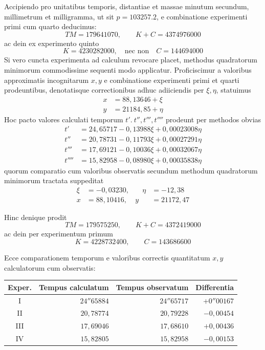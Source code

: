 Accipiendo pro unitatibus temporis, distantiae et massae minutum secundum, millimetrum et milligramma, ut sit $p=103257.2$, e combinatione experimenti primi cum quarto deducimus:
\[
TM=179641070,\qquad K+C=4374976000
\]
ac dein ex experimento quinto
\[
K=4230282000,\quad \text{nec non}\quad C=144694000
\]
Si vero cuncta experimenta ad calculum revocare placet, methodus quadratorum minimorum commodissime sequenti modo applicatur. Proficiscimur a valoribus approximatis incognitarum $x,y$ e combinatione experimenti primi et quarti prodeuntibus, denotatisque correctionibus adhuc adiiciendis per $\xi,\eta$, statuimus
\[
\begin{aligned}
x&=88{,}13646+\xi\\
y&=21184{,}85+\eta
\end{aligned}
\]
Hoc pacto valores calculati temporum $t'.\ t'',t''',t''''$ prodeunt per methodos obvias
\[
\begin{aligned}
t'&=24{,}65717-0{,}13988\xi+0{,}00023008\eta\\
t''&=20{,}78731-0{,}11793\xi+0{,}00027291\eta\\
t'''&=17{,}69121-0{,}10036\xi+0{,}00032067\eta\\
t''''&=15{,}82958-0{,}08980\xi+0{,}00035838\eta
\end{aligned}
\]
quorum comparatio cum valoribus observatis secundum methodum quadratorum minimorum tractata suppeditat
\[
\begin{aligned}
\xi&=-0{,}03230,&\quad\eta&=-12{,}38\\
x&=88{,}10416,&y&=21172{,}47
\end{aligned}
\]

Hinc denique prodit
\[
TM=179575250,\qquad K+C=4372419000
\]
ac dein per experimentum primum
\[
K=4228732400,\qquad C=143686600
\]

Ecce comparationem temporum e valoribus correctis quantitatum $x,y$ calculatorum cum observatis:
\begin{center}
\begin{tabular}{c|r|r|r}
Exper.&Tempus calculatum&Tempus observatum&Differentia\\\hline
I&$24''65884$&$24''65717$&$+0''00167$\\
II&$20{,}78774$&$20{,}79228$&$-0{,}00454$\\
III&$17{,}69046$&$17{,}68610$&$+0{,}00436$\\
IV&$15{,}82805$&$15{,}82958$&$-0{,}00153$
\end{tabular}
\end{center}

